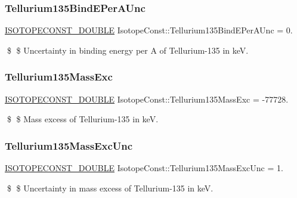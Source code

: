 \subsubsection{\texorpdfstring{Tellurium135\+Bind\+E\+Per\+A\+Unc}{Tellurium135BindEPerAUnc}}
{\footnotesize\ttfamily \mbox{\hyperlink{group___isotope_const-_macros_ga8f45a7272ce02c0b4c65c44636ed719a}{I\+S\+O\+T\+O\+P\+E\+C\+O\+N\+S\+T\+\_\+\+D\+O\+U\+B\+LE}} Isotope\+Const\+::\+Tellurium135\+Bind\+E\+Per\+A\+Unc = 0.}

\$ \$ Uncertainty in binding energy per A of Tellurium-\/135 in keV. \mbox{\label{group___isotope_const-_tellurium-_te135_ga537cee33b9134f803a34a22e03da68f3}} 
\subsubsection{\texorpdfstring{Tellurium135\+Mass\+Exc}{Tellurium135MassExc}}
{\footnotesize\ttfamily \mbox{\hyperlink{group___isotope_const-_macros_ga8f45a7272ce02c0b4c65c44636ed719a}{I\+S\+O\+T\+O\+P\+E\+C\+O\+N\+S\+T\+\_\+\+D\+O\+U\+B\+LE}} Isotope\+Const\+::\+Tellurium135\+Mass\+Exc = -\/77728.}

\$ \$ Mass excess of Tellurium-\/135 in keV. \mbox{\label{group___isotope_const-_tellurium-_te135_ga5a64bd7a0f43aea1f67807c107210115}} 
\subsubsection{\texorpdfstring{Tellurium135\+Mass\+Exc\+Unc}{Tellurium135MassExcUnc}}
{\footnotesize\ttfamily \mbox{\hyperlink{group___isotope_const-_macros_ga8f45a7272ce02c0b4c65c44636ed719a}{I\+S\+O\+T\+O\+P\+E\+C\+O\+N\+S\+T\+\_\+\+D\+O\+U\+B\+LE}} Isotope\+Const\+::\+Tellurium135\+Mass\+Exc\+Unc = 1.}

\$ \$ Uncertainty in mass excess of Tellurium-\/135 in keV. \mbox{\label{group___isotope_const-_tellurium-_te135_ga570154c4e685a16aece28e1165c65f8b}} 
